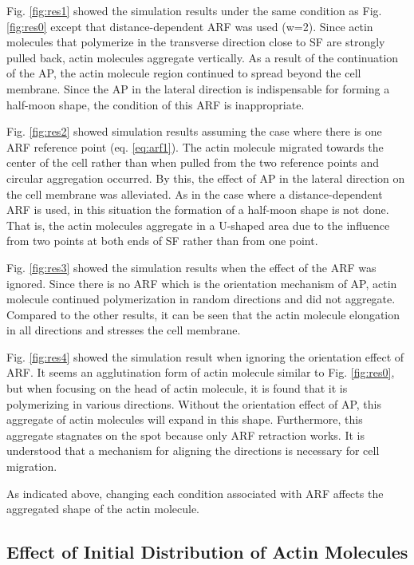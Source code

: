\documentclass[a4paper,12pt, oneside]{book}
\begin{document}
Fig. \ref{fig:res1} showed the simulation results under the same condition as Fig. \ref{fig:res0} except that distance-dependent ARF was  used (w=2).
Since actin molecules that polymerize in the transverse direction close to SF are strongly pulled back, actin molecules aggregate vertically.
As a result of the continuation of the AP, the actin molecule region continued to spread beyond the cell membrane.
Since the AP in the lateral direction is indispensable for forming a half-moon shape, the condition of this ARF is inappropriate.

Fig. \ref{fig:res2} showed simulation results assuming the case where there is one ARF reference point (eq. \ref{eq:arf1}).
The actin molecule migrated towards the center of the cell rather than when pulled from the two reference points and circular aggregation occurred.
By this, the effect of AP in the lateral direction on the cell membrane was alleviated.
As in the case where a distance-dependent ARF is used, in this situation the formation of a half-moon shape is not done.
That is, the actin molecules aggregate in a U-shaped area due to the influence from two points at both ends of SF rather than from one point.

Fig. \ref{fig:res3} showed the simulation results when the effect of the ARF was ignored.
Since there is no ARF which is the orientation mechanism of AP, actin molecule continued polymerization in random directions and did not aggregate.
Compared to the other results, it can be seen that the actin molecule elongation in all directions and stresses the cell membrane.

Fig. \ref{fig:res4} showed the simulation result when ignoring the orientation effect of ARF.
It seems an agglutination form of actin molecule similar to Fig. \ref{fig:res0}, but when focusing on the head of actin molecule, it is found that it is polymerizing in various directions.
Without the orientation effect of AP, this aggregate of actin molecules will expand in this shape.
Furthermore, this aggregate stagnates on the spot because only ARF retraction works.
It is understood that a mechanism for aligning the directions is necessary for cell migration.

As indicated above, changing each condition associated with ARF affects the aggregated shape of the actin molecule.

\subsection{Effect of Initial Distribution of Actin Molecules}
\end{document}
